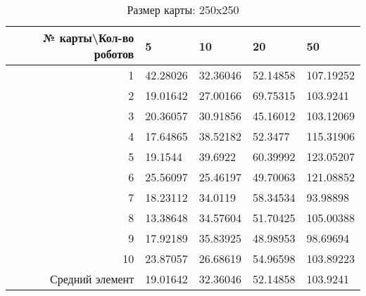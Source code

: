\begin{table}[H]
\centering
\begin{tabular}{|r|l|l|l|l|}
\hline
№ карты\textbackslash Кол-во роботов & \textbf{5} & \textbf{10} & \textbf{20} & \textbf{50}\\ \hline
1 & 42.28026 & 32.36046 & 52.14858 & 107.19252\\ \hline
2 & 19.01642 & 27.00166 & 69.75315 & 103.9241\\ \hline
3 & 20.36057 & 30.91856 & 45.16012 & 103.12069\\ \hline
4 & 17.64865 & 38.52182 & 52.3477 & 115.31906\\ \hline
5 & 19.1544 & 39.6922 & 60.39992 & 123.05207\\ \hline
6 & 25.56097 & 25.46197 & 49.70063 & 121.08852\\ \hline
7 & 18.23112 & 34.0119 & 58.34534 & 93.98898\\ \hline
8 & 13.38648 & 34.57604 & 51.70425 & 105.00388\\ \hline
9 & 17.92189 & 35.83925 & 48.98953 & 98.69694\\ \hline
10 & 23.87057 & 26.68619 & 54.96598 & 103.89223\\ \hline
Средний элемент & 19.01642 & 32.36046 & 52.14858 & 103.9241\\ \hline
\end{tabular}
\caption*{Размер карты: 250x250}
\end{table}
